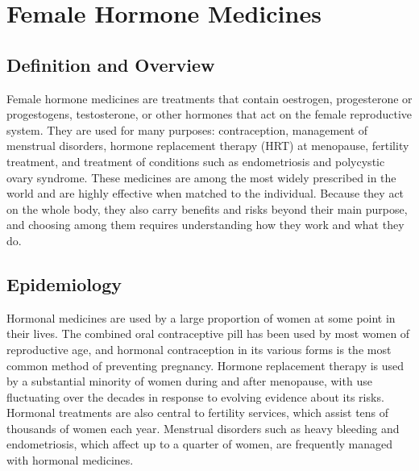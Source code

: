 \chapter{Female Hormone Medicines}

\section*{Definition and Overview}
Female hormone medicines are treatments that contain oestrogen, progesterone or progestogens, testosterone, or other hormones that act on the female reproductive system. They are used for many purposes: contraception, management of menstrual disorders, hormone replacement therapy (HRT) at menopause, fertility treatment, and treatment of conditions such as endometriosis and polycystic ovary syndrome. These medicines are among the most widely prescribed in the world and are highly effective when matched to the individual. Because they act on the whole body, they also carry benefits and risks beyond their main purpose, and choosing among them requires understanding how they work and what they do.

\section*{Epidemiology}
Hormonal medicines are used by a large proportion of women at some point in their lives. The combined oral contraceptive pill has been used by most women of reproductive age, and hormonal contraception in its various forms is the most common method of preventing pregnancy. Hormone replacement therapy is used by a substantial minority of women during and after menopause, with use fluctuating over the decades in response to evolving evidence about its risks. Hormonal treatments are also central to fertility services, which assist tens of thousands of women each year. Menstrual disorders such as heavy bleeding and endometriosis, which affect up to a quarter of women, are frequently managed with hormonal medicines.

